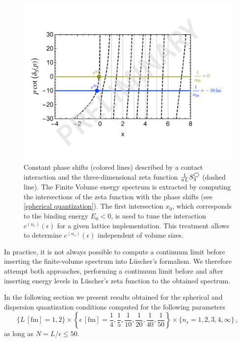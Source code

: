 \begin{figure}
\center
\includegraphics[width=.7\textwidth]{figure/tuning.pdf}
\caption{\label{fig:tuning}
    Constant phase shifts (colored lines) described by a contact interaction and the three-dimensional zeta function $\frac{1}{\pi L} S^{\bigcirc}_3$ (dashed line).
    The Finite Volume energy spectrum is extracted by computing the intersections of the zeta function with the phase shifts (see \eqref{spherical quantization}).
    The first intersection $x_0$, which corresponds to the binding energy $E_0 < 0$, is used to tune the interaction $c^{(n_s)}(\epsilon)$ for a given lattice implementation.
    This treatment allows to determine $c^{(n_s)}(\epsilon)$ independent of volume sizes.
}
\end{figure}

In practice, it is not always possible to compute a continuum limit before inserting the finite-volume spectrum into L\"{u}scher's formalism.
We therefore attempt both approaches, performing a continuum limit before and after inserting energy levels in L\"{u}scher's zeta function to the obtained spectrum.

In the following section we present results obtained for the spherical and dispersion quantization conditions computed for the following parameters
\begin{equation}
    \{ L \,[\mathrm{fm}]= 1, 2 \}
    \times \left\{ \epsilon \,[\mathrm{fm}] = \frac{1}{4}, \frac{1}{5}, \frac{1}{10}, \frac{1}{20}, \frac{1}{40}, \frac{1}{50} \right\}
    \times \{ n_s = 1, 2, 3, 4, \infty \}
    \, ,
\end{equation}
as long as $N = L / \epsilon \leq 50$.




